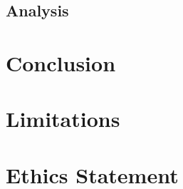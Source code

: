 \documentclass{article}
\begin{document}
\subsection{Analysis}

\section{Conclusion}

\section*{Limitations}

\section*{Ethics Statement}

\makeatletter
{}
\makeatother

\end{document}
